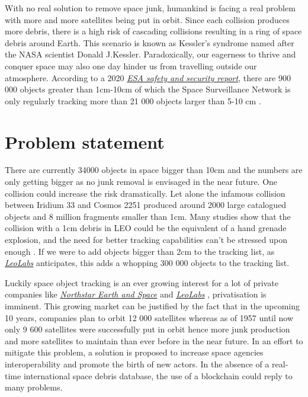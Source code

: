 \documentclass[conference]{IEEEtran}
\begin{document}
With no real solution to remove space junk, humankind is facing a real problem with more and more satellites being put in orbit. 
Since each collision produces more debris, there is a high risk of cascading collisions resulting in a ring of space debris around Earth. This scenario is known as Kessler's syndrome \cite{Kessler} named after the NASA scientist Donald J.Kessler.
Paradoxically,
our eagerness to thrive and conquer space may also one day hinder us from travelling outside our atmosphere. According to a 2020 \href{https://www.esa.int/Safety_Security/Space_Debris/Space_debris_by_the_numbers}{\textit{ESA safety and security report}}, there are 900 000 objects greater than 1cm-10cm of which the Space Surveillance Network is only regularly tracking more than 21 000 objects larger than 5-10 cm \cite{NasaOrbitalDebris}.

\section{Problem statement}
There are currently 34000 objects in space bigger than 10cm and the numbers are only getting bigger as no junk removal is envisaged in the near future. One collision could increase the risk dramatically. Let alone the infamous collision between Iridium 33 and Cosmos 2251 produced around 2000 large catalogued objects and 8 million fragments smaller than 1cm. Many studies show that the collision with a 1cm debris in LEO could be the equivalent of a hand grenade explosion, and the need for better tracking capabilities can't be stressed upon enough \cite{SmallDebrisImpact}. If we were to add objects bigger than 2cm to the tracking list, as \href{https://www.leolabs.space/}{\textit{LeoLabs}} anticipates, this adds a whopping 300 000 objects to the tracking list.

Luckily space object tracking is an ever growing interest for a lot of private companies like \href{https://northstar-data.com}{\textit{Northstar Earth and Space}} \cite{SpaceNews} \cite{Axios} and \href{https://www.leolabs.space/}{\textit{LeoLabs}} \cite{DigitalTrends} \cite{Axios}, privatisation is imminent. This growing market can be justified by the fact that in the upcoming 10 years, companies plan to orbit 12 000 satellites whereas as of 1957 until now only 9 600 satellites were successfully put in orbit hence more junk production and more satellites to maintain than ever before in the near future. In an effort to mitigate this problem, a solution is proposed to increase space agencies interoperability and promote the birth of new actors. In the absence of a real-time international space debris database, the use of a blockchain could reply to many problems.
\end{document}
